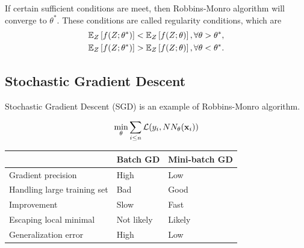 \begin{definition}
	If certain sufficient conditions are meet, then Robbins-Monro algorithm will converge to $\theta^*$. These conditions are called regularity conditions, which are
\begin{align*}
	\mathbb{E}_{Z}\left[ f(Z; \theta^*) \right] & < \mathbb{E}_{Z}\left[ f(Z; \theta) \right], \forall \theta > \theta^*, \\
	\mathbb{E}_{Z}\left[ f(Z; \theta^*) \right] & > \mathbb{E}_{Z}\left[ f(Z; \theta) \right], \forall \theta < \theta^*. 
\end{align*}
\end{definition}

\subsection{Stochastic Gradient Descent}
Stochastic Gradient Descent (SGD) is an example of Robbins-Monro algorithm. 
\begin{definition}
	\begin{equation}
		\min_\theta \sum_{i \leq n} \mathcal{L}(y_i, NN_\theta(\mathbf{x}_i))
	\end{equation}
\end{definition}
\begin{tabular}{p{5.5cm} p{4cm} p{4cm}}
\toprule
	& \textbf{Batch GD} & \textbf{Mini-batch GD} \\
	\midrule
Gradient precision & High & Low \\
Handling large training set & Bad & Good \\
Improvement & Slow & Fast \\
Escaping local minimal & Not likely & Likely \\
Generalization error & High & Low \\
\bottomrule
\end{tabular}